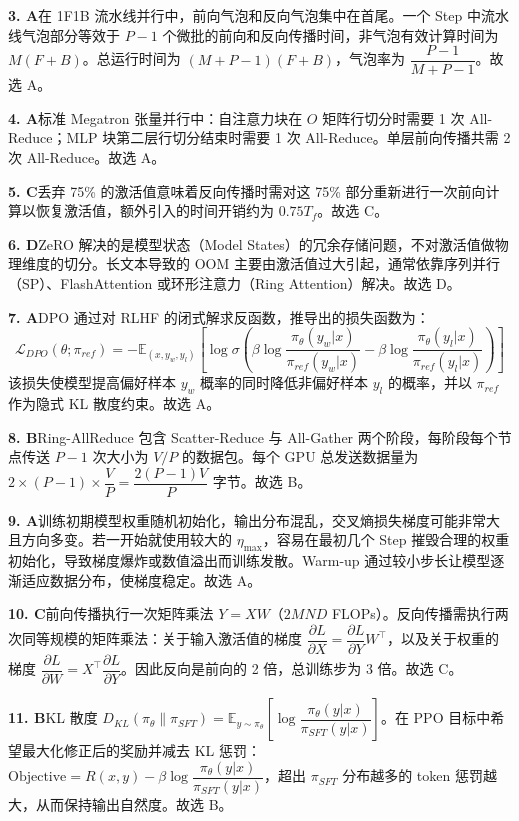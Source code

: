 \documentclass[11pt,a4paper]{article}
\begin{document}
\noindent\textbf{3. A}\quad 在 1F1B 流水线并行中，前向气泡和反向气泡集中在首尾。一个 Step 中流水线气泡部分等效于 $P-1$ 个微批的前向和反向传播时间，非气泡有效计算时间为 $M(F+B)$。总运行时间为 $(M+P-1)(F+B)$，气泡率为 $\dfrac{P-1}{M+P-1}$。故选 A。

\noindent\textbf{4. A}\quad 标准 Megatron 张量并行中：自注意力块在 $O$ 矩阵行切分时需要 1 次 All-Reduce；MLP 块第二层行切分结束时需要 1 次 All-Reduce。单层前向传播共需 2 次 All-Reduce。故选 A。

\noindent\textbf{5. C}\quad 丢弃 75\% 的激活值意味着反向传播时需对这 75\% 部分重新进行一次前向计算以恢复激活值，额外引入的时间开销约为 $0.75 T_f$。故选 C。

\noindent\textbf{6. D}\quad ZeRO 解决的是模型状态（Model States）的冗余存储问题，不对激活值做物理维度的切分。长文本导致的 OOM 主要由激活值过大引起，通常依靠序列并行（SP）、FlashAttention 或环形注意力（Ring Attention）解决。故选 D。

\noindent\textbf{7. A}\quad DPO 通过对 RLHF 的闭式解求反函数，推导出的损失函数为：
\[
\mathcal{L}_{DPO}(\theta;\pi_{ref})=-\mathbb{E}_{(x,y_w,y_l)}\!\left[\log\sigma\!\left(\beta\log\frac{\pi_\theta(y_w|x)}{\pi_{ref}(y_w|x)}-\beta\log\frac{\pi_\theta(y_l|x)}{\pi_{ref}(y_l|x)}\right)\right]
\]
该损失使模型提高偏好样本 $y_w$ 概率的同时降低非偏好样本 $y_l$ 的概率，并以 $\pi_{ref}$ 作为隐式 KL 散度约束。故选 A。

\noindent\textbf{8. B}\quad Ring-AllReduce 包含 Scatter-Reduce 与 All-Gather 两个阶段，每阶段每个节点传送 $P-1$ 次大小为 $V/P$ 的数据包。每个 GPU 总发送数据量为 $2\times(P-1)\times\dfrac{V}{P}=\dfrac{2(P-1)V}{P}$ 字节。故选 B。

\noindent\textbf{9. A}\quad 训练初期模型权重随机初始化，输出分布混乱，交叉熵损失梯度可能非常大且方向多变。若一开始就使用较大的 $\eta_{\max}$，容易在最初几个 Step 摧毁合理的权重初始化，导致梯度爆炸或数值溢出而训练发散。Warm-up 通过较小步长让模型逐渐适应数据分布，使梯度稳定。故选 A。

\noindent\textbf{10. C}\quad 前向传播执行一次矩阵乘法 $Y=XW$（$2MND$ FLOPs）。反向传播需执行两次同等规模的矩阵乘法：关于输入激活值的梯度 $\dfrac{\partial L}{\partial X}=\dfrac{\partial L}{\partial Y}W^{\top}$，以及关于权重的梯度 $\dfrac{\partial L}{\partial W}=X^{\top}\dfrac{\partial L}{\partial Y}$。因此反向是前向的 2 倍，总训练步为 3 倍。故选 C。

\noindent\textbf{11. B}\quad KL 散度 $D_{KL}(\pi_\theta\parallel\pi_{SFT})=\mathbb{E}_{y\sim\pi_\theta}\!\left[\log\dfrac{\pi_\theta(y|x)}{\pi_{SFT}(y|x)}\right]$。在 PPO 目标中希望最大化修正后的奖励并减去 KL 惩罚：$\text{Objective}=R(x,y)-\beta\log\dfrac{\pi_\theta(y|x)}{\pi_{SFT}(y|x)}$，超出 $\pi_{SFT}$ 分布越多的 token 惩罚越大，从而保持输出自然度。故选 B。
\end{document}
